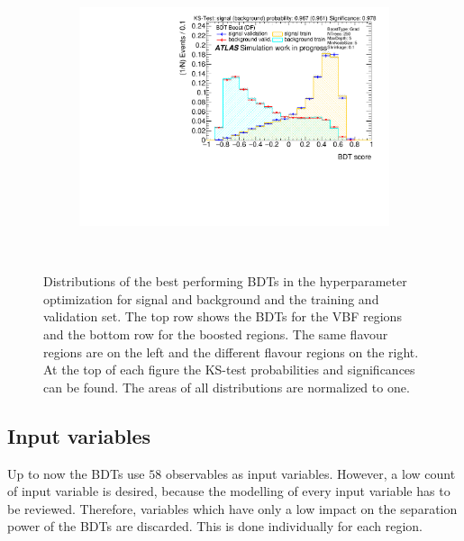 \begin{figure}[htbp]
\begin{subfigure}[t]{0.49\textwidth}
    \end{subfigure}
    \begin{subfigure}[t]{0.49\textwidth}
        \includegraphics[width=\textwidth]{./plots/mva/scan/BOOST_DF_bdt_output.pdf}
    \end{subfigure}
    \caption{Distributions of the best performing BDTs in the hyperparameter optimization for signal and background and the training and validation set.
             The top row shows the BDTs for the VBF regions and the bottom row for the boosted regions.
             The same flavour regions are on the left and the different flavour regions on the right.
             At the top of each figure the KS-test probabilities and significances can be found.
             The areas of all distributions are normalized to one.}~\label{fig:mva:scan:bdts}
\end{figure}

\FloatBarrier{}

\subsection{Input variables}\label{sub:mva:input_variables}

Up to now the BDTs use $58$ observables as input variables.
However, a low count of input variable is desired, because the modelling of every input variable has to be reviewed.
Therefore, variables which have only a low impact on the separation power of the BDTs are discarded.
This is done individually for each region.

